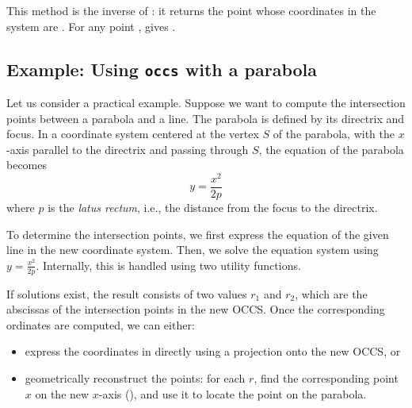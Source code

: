 This method is the inverse of : it returns the
point whose coordinates in the system are .
For any point ,  gives .

\begin{tkzexample}[latex=.5\textwidth]
\end{tkzexample}

\subsection{Example: Using \texttt{occs} with a parabola}

Let us consider a practical example. Suppose we want to compute the intersection points between a parabola and a line. The parabola is defined by its directrix and focus. In a coordinate system centered at the vertex $S$ of the parabola, with the $x$-axis parallel to the directrix and passing through $S$, the equation of the parabola becomes
\[
y = \frac{x^2}{2p}
\]
where $p$ is the \emph{latus rectum}, i.e., the distance from the focus to the directrix.

\vspace{1em}

To determine the intersection points, we first express the equation of the given line in the new coordinate system. Then, we solve the equation system using $y = \frac{x^2}{2p}$. Internally, this is handled using two utility functions.

\vspace{1em}

If solutions exist, the result consists of two values $r_1$ and $r_2$, which are the abscissas of the intersection points in the new OCCS. Once the corresponding ordinates are computed, we can either:
\begin{itemize}
  \item express the coordinates in \TIKZ{} directly using a projection onto the new OCCS, or
  \item geometrically reconstruct the points: for each $r$, find the corresponding point $x$ on the new $x$-axis (), and use it to locate the point on the parabola.
\end{itemize}

